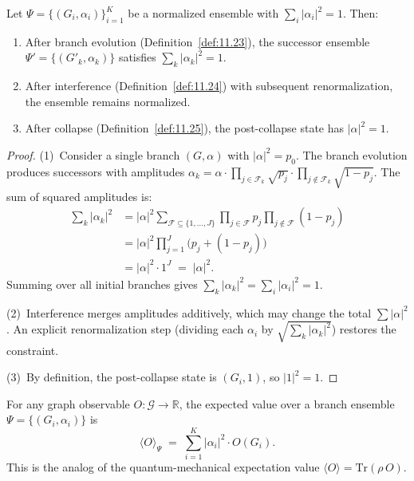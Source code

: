 \begin{theorem}
\label{thm:11.6}
Let $\Psi = \{(G_i, \alpha_i)\}_{i=1}^K$ be a normalized ensemble
with $\sum_i |\alpha_i|^2 = 1$.  Then:
\begin{enumerate}
  \item After branch evolution
    (Definition~\ref{def:11.23}), the successor ensemble
    $\Psi' = \{(G'_k, \alpha_k)\}$ satisfies
    $\sum_k |\alpha_k|^2 = 1$.
  \item After interference (Definition~\ref{def:11.24}) with
    subsequent renormalization, the ensemble remains normalized.
  \item After collapse (Definition~\ref{def:11.25}), the
    post-collapse state has $|\alpha|^2 = 1$.
\end{enumerate}
\end{theorem}

\begin{proof}
(1)~Consider a single branch $(G, \alpha)$ with $|\alpha|^2 = p_0$.
The branch evolution produces successors with amplitudes
$\alpha_k = \alpha \cdot \prod_{j \in \mathcal{F}_k} \sqrt{p_j}
\cdot \prod_{j \notin \mathcal{F}_k} \sqrt{1 - p_j}$.
The sum of squared amplitudes is:
\begin{align*}
  \sum_k |\alpha_k|^2
  &= |\alpha|^2
     \sum_{\mathcal{F} \subseteq \{1,\ldots,J\}}
     \prod_{j \in \mathcal{F}} p_j
     \prod_{j \notin \mathcal{F}} (1 - p_j) \\
  &= |\alpha|^2
     \prod_{j=1}^{J} \bigl(p_j + (1 - p_j)\bigr) \\
  &= |\alpha|^2 \cdot 1^J
  \;=\; |\alpha|^2.
\end{align*}
Summing over all initial branches gives
$\sum_k |\alpha_k|^2 = \sum_i |\alpha_i|^2 = 1$.

(2)~Interference merges amplitudes additively, which may change the
total $\sum |\alpha|^2$.  An explicit renormalization step
(dividing each $\alpha_i$ by $\sqrt{\sum_k |\alpha_k|^2}$) restores
the constraint.

(3)~By definition, the post-collapse state is $(G_i, 1)$, so
$|1|^2 = 1$.
\end{proof}

\begin{theorem}
\label{thm:11.7}
For any graph observable $O \colon \mathcal{G} \to \mathbb{R}$, the
expected value over a branch ensemble
$\Psi = \{(G_i, \alpha_i)\}$ is
\begin{equation}
\label{eq:11.observable}
  \langle O \rangle_\Psi
  \;=\;
  \sum_{i=1}^{K} |\alpha_i|^2 \cdot O(G_i).
\end{equation}
This is the analog of the quantum-mechanical expectation value
$\langle O \rangle = \mathrm{Tr}(\rho \, O)$.
\end{theorem}

